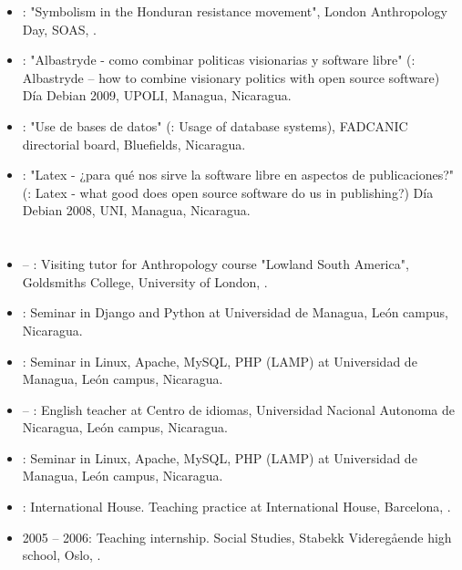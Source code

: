 \begin{itemize}
\item {}: "Symbolism in the Honduran resistance movement", London Anthropology Day, SOAS, \UK.

\item {}: "Albastryde - como combinar politicas visionarias y software libre" (\english: Albastryde – how to combine visionary politics with open source software) Día Debian 2009, UPOLI, Managua, Nicaragua.

\item {}: "Use de bases de datos" (\english: Usage of database systems), FADCANIC directorial board, Bluefields, Nicaragua.

\item {}: "Latex - ¿para qué nos sirve la software libre en aspectos de publicaciones?" (\english: Latex - what good does open source software do us in publishing?) Día Debian 2008, UNI, Managua, Nicaragua.
\end{itemize}


\section*{\teachingexperience}

\begin{itemize}
\item {} – : Visiting tutor for Anthropology course "Lowland South America", Goldsmiths College, University of London, \UK.

\item {}: Seminar in Django and Python at Universidad de Managua, León campus, Nicaragua.

\item {}: Seminar in Linux, Apache, MySQL, PHP (LAMP) at Universidad de Managua, León campus, Nicaragua.

\item {} – : English teacher at Centro de idiomas, Universidad Nacional Autonoma de Nicaragua, León campus, Nicaragua.

\item {}: Seminar in Linux, Apache, MySQL, PHP (LAMP) at Universidad de Managua, León campus, Nicaragua.

\item {}: International House. Teaching practice at International House, Barcelona, \Spain.

\item 2005 – 2006: Teaching internship. \english \und Social Studies, Stabekk Videregående high school, Oslo, \Norway.

\end{itemize}
